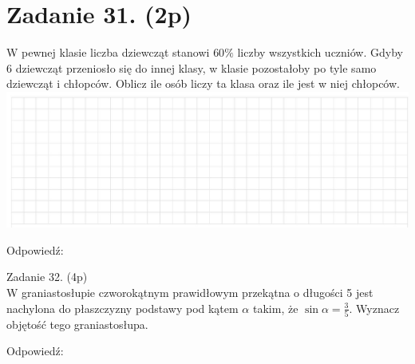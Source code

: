 \documentclass[10pt]{article}
\begin{document}
\section*{Zadanie 31. (2p)}
W pewnej klasie liczba dziewcząt stanowi \(60 \%\) liczby wszystkich uczniów. Gdyby 6 dziewcząt przeniosło się do innej klasy, w klasie pozostałoby po tyle samo dziewcząt i chłopców. Oblicz ile osób liczy ta klasa oraz ile jest w niej chłopców.\\
\includegraphics[max width=\textwidth, center]{2024_11_21_19ede52d758866b0d67eg-10(1)}

Odpowiedź:

Zadanie 32. (4p)\\
W graniastosłupie czworokątnym prawidłowym przekątna o długości 5 jest nachylona do płaszczyzny podstawy pod kątem \(\alpha\) takim, że \(\sin \alpha=\frac{3}{5}\). Wyznacz objętość tego graniastosłupa.

Odpowiedź:
\end{document}
